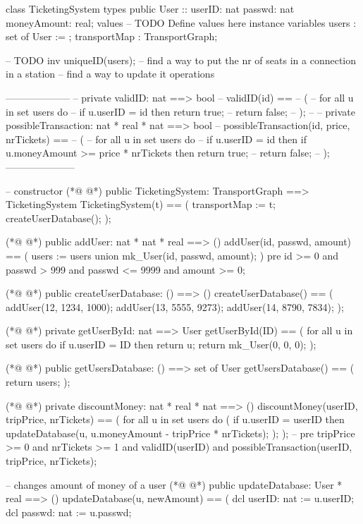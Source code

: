 \begin{vdmpp}[breaklines=true]
 class TicketingSystem
types
 public User :: userID: nat
          passwd: nat
         moneyAmount: real;
values
-- TODO Define values here
instance variables
 users : set of User := {};
 transportMap : TransportGraph;
 
 -- TODO
  inv uniqueID(users);
 -- find a way to put the nr of seats in a connection in a station
 -- find a way to update it 
operations

 --------------------
-- private validID: nat ==> bool
-- validID(id) ==
-- (
--  for all u in set users do
--   if u.userID = id then return true;
--  return false;
-- );
-- 
-- private possibleTransaction: nat * real * nat ==> bool
-- possibleTransaction(id, price, nrTickets) ==
-- (
--  for all u in set users do
--   if u.userID = id then if u.moneyAmount >= price * nrTickets then return true;
--  return false;
-- );
 ---------------------
 
 -- constructor
(*@
\label{TicketingSystem:37}
@*)
 public TicketingSystem: TransportGraph ==> TicketingSystem
 TicketingSystem(t) ==
 (
  transportMap := t;
  createUserDatabase();
 );
 
(*@
\label{addUser:44}
@*)
 public addUser: nat * nat * real ==> ()
 addUser(id, passwd, amount) ==
 (
  users := users union {mk_User(id, passwd, amount)};
 )
 pre id >= 0 and passwd > 999 and passwd <= 9999 and amount >= 0;
 
(*@
\label{createUserDatabase:51}
@*)
 public createUserDatabase: () ==> ()
 createUserDatabase() ==
 (
  addUser(12, 1234, 1000);
  addUser(13, 5555, 9273);
  addUser(14, 8790, 7834);
 );
 
(*@
\label{getUserById:59}
@*)
 private getUserById: nat ==> User
 getUserById(ID) ==
 (
  for all u in set users do
   if u.userID = ID then return u;
  return mk_User(0, 0, 0);
 );
 
(*@
\label{getUsersDatabase:67}
@*)
 public getUsersDatabase: () ==> set of User 
 getUsersDatabase() ==
 (
  return users;
 );
 
(*@
\label{discountMoney:73}
@*)
 private discountMoney: nat * real * nat ==> ()
 discountMoney(userID, tripPrice, nrTickets) ==
 (
  for all u in set users do (
   if u.userID = userID then
    updateDatabase(u, u.moneyAmount - tripPrice * nrTickets);
  );
 );
 -- pre tripPrice >= 0 and nrTickets >= 1 and validID(userID) and possibleTransaction(userID, tripPrice, nrTickets);
 
 -- changes amount of money of a user
(*@
\label{updateDatabase:84}
@*)
 public updateDatabase: User * real ==> ()
 updateDatabase(u, newAmount) ==
 (
  dcl userID: nat := u.userID;
  dcl passwd: nat := u.passwd;
  

\end{vdmpp}
